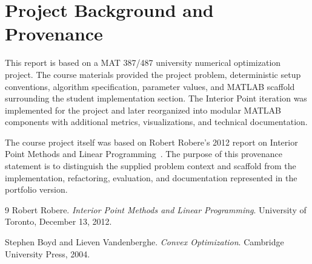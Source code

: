 \documentclass[11pt]{article}
\begin{document}
\section{Project Background and Provenance}
This report is based on a MAT 387/487 university numerical optimization project. The course materials provided the project problem, deterministic setup conventions, algorithm specification, parameter values, and MATLAB scaffold surrounding the student implementation section. The Interior Point iteration was implemented for the project and later reorganized into modular MATLAB components with additional metrics, visualizations, and technical documentation.

The course project itself was based on Robert Robere's 2012 report on Interior Point Methods and Linear Programming~\cite{robere2012}. The purpose of this provenance statement is to distinguish the supplied problem context and scaffold from the implementation, refactoring, evaluation, and documentation represented in the portfolio version.

\begin{thebibliography}{9}
Robert Robere.
\newblock \emph{Interior Point Methods and Linear Programming}.
\newblock University of Toronto, December 13, 2012.

Stephen Boyd and Lieven Vandenberghe.
\newblock \emph{Convex Optimization}.
\newblock Cambridge University Press, 2004.
\end{thebibliography}

\appendix
\end{document}
